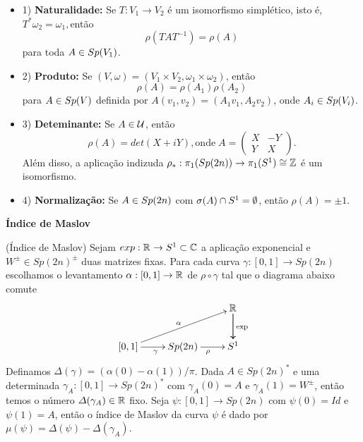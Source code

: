 \documentclass{beamer}
\newcommand{\titulo}[1]{\centering \textbf{#1}}
\begin{document}
\begin{frame}
	\begin{itemize}
			\item 1) \textbf{Naturalidade:}  Se $T:V_{1} \to V_{2}$ é um isomorfismo simplético, isto é, $T^{*}\omega_{2} = \omega_{1}, $então 
			$$
			\rho(TAT^{-1}) = \rho(A)
			$$
			para toda $A\in Sp(V_{1})$.
			
			\item 2) \textbf{Produto:} Se $(V,\omega) = (V_{1}\times V_{2},\omega_{1}\times \omega_{2})$, então
			$$
			\rho(A) = \rho(A_{1})\rho(A_{2})
			$$
			para $A\in Sp(V)$ definida por $A(v_{1}, v_{2})=(A_{1}v_{1}, A_{2}v_{2})$, onde $A_{i} \in Sp(V_{i})$.
			
			\item 3) \textbf{Deteminante:} Se $A\in \mathcal{U}$, então 
			$$
			\rho(A) = det(X+iY), \text{onde} \;	
			A=\left(
			\begin{array}{cc}
			X & -Y					\\
			Y & X
			\end{array}
			\right).
			$$
			Além disso, a aplicação indizuda $\rho_{*}: \pi_{1}(Sp(2n)) \to \pi_{1}(S^{1}) \cong \mathbb{Z}$ é um isomorfismo.
			
			\item 4) \textbf{Normalização:} Se $A \in Sp(2n)$ com $\sigma(A)\cap S^{1} = \emptyset$, então $\rho(A) = \pm 1$.
		
	\end{itemize}
\end{frame}

\begin{frame}
	\titulo{Índice de Maslov}
	\begin{definicao}
		(Índice de Maslov) Sejam $exp:\mathbb{R}^{} \to S^{1} \subset \mathbb{C}$ a aplicação exponencial e $W^{\pm} \in Sp(2n)^{\pm}$ duas matrizes fixas. Para cada curva $\gamma:[0,1] \to Sp(2n)$ escolhamos o levantamento $\alpha:[0,1] \to \mathbb{R}^{}$ de $\rho\circ \gamma$ tal que o diagrama abaixo comute
		$$
		\xymatrix{
			& & \real{}\ar[d]\ar[d]^{\text{exp}}
			\\
			[0,1 ]\ar[urr]^{\alpha} \ar[r]_{\gamma} & Sp(2n) \ar[r]_{\rho} & S^{1}
		}
		$$	
		Definamos $\varDelta(\gamma) = (\alpha(0) - \alpha(1))/\pi$. Dada $A \in Sp(2n)^{*}$ e uma determinada $\gamma_{A}:[0,1] \to Sp(2n)^{*}$ com $\gamma_{A}(0) = A$ e $\gamma_{A}(1) = W^{\pm}$, então temos o número $\varDelta(\gamma_{A}) \in \mathbb{R}^{}$ fixo.
		Seja $\psi:[0,1] \to Sp(2n)$ com $\psi(0)=Id$ e $\psi(1)=A$, então o índice de Maslov da curva $\psi$ é dado por $\mu(\psi) = \varDelta(\psi) - \varDelta(\gamma_{A})$.
	
	\end{definicao}
	
\end{frame}
\end{document}
